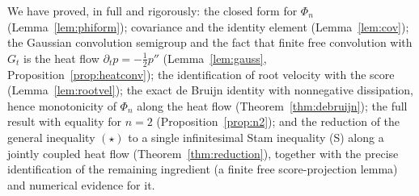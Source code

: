 \documentclass[12pt]{article}
\theoremstyle{remark}
\begin{document}
We have proved, in full and rigorously: the closed form for $\Phi_n$
(Lemma~\ref{lem:phiform}); covariance and the identity element
(Lemma~\ref{lem:cov}); the Gaussian convolution semigroup and the fact that
finite free convolution with $G_t$ is the heat flow
$\partial_t p=-\tfrac12 p''$ (Lemma~\ref{lem:gauss},
Proposition~\ref{prop:heatconv}); the identification of root velocity with the
score (Lemma~\ref{lem:rootvel}); the exact de Bruijn identity with nonnegative
dissipation, hence monotonicity of $\Phi_n$ along the heat flow
(Theorem~\ref{thm:debruijn}); the full result with equality for $n=2$
(Proposition~\ref{prop:n2}); and the reduction of the general inequality
$(\star)$ to a single infinitesimal Stam inequality (S) along a jointly
coupled heat flow (Theorem~\ref{thm:reduction}), together with the precise
identification of the remaining ingredient (a finite free score-projection
lemma) and numerical evidence for it.
\end{document}
